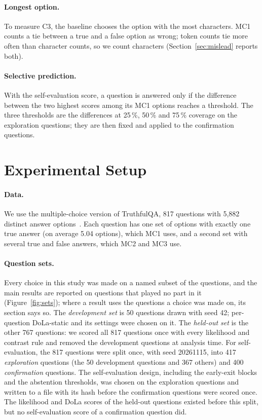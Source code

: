 \documentclass[11pt]{article}
\newcommand{\cha}[1]{\textsf{C#1}}
\newcommand{\method}{per-question DoLa-static}
\begin{document}
\paragraph{Longest option.}
To measure \cha3, the baseline chooses the option with the most characters. MC1 counts a tie between a true and
a false option as wrong; token counts tie more often than character counts, so we count characters
(Section~\ref{sec:mislead} reports both).

\paragraph{Selective prediction.}
With the self-evaluation score, a question is answered only if the difference between the two highest scores among
its MC1 options reaches a threshold. The three thresholds are the differences at 25\,\%, 50\,\% and 75\,\% coverage on
the exploration questions; they are then fixed and applied to the confirmation questions.

\section{Experimental Setup}
\label{sec:setup}
\paragraph{Data.}
We use the multiple-choice version of TruthfulQA, 817 questions with 5,882 distinct answer
options~\citep{lin2022truthfulqa}. Each question has one set of options with exactly one true answer (on average
5.04 options), which MC1 uses, and a second set with several true and false answers, which MC2 and MC3 use.

\paragraph{Question sets.}
Every choice in this study was made on a named subset of the questions, and the main results are reported on
questions that played no part in it (Figure~\ref{fig:sets}); where a result uses the questions a choice was made on,
its section says so. The \emph{development set} is 50 questions drawn with seed 42;
\method{} and its settings were chosen on it. The \emph{held-out set} is the other 767
questions: we scored all 817 questions once with every likelihood and contrast rule and removed the development
questions at analysis time. For self-evaluation, the 817 questions were split once, with seed 20261115, into 417
\emph{exploration} questions (the 50 development questions and 367 others) and 400 \emph{confirmation} questions. The
self-evaluation design, including the early-exit blocks and the abstention thresholds, was chosen on the
exploration questions and written to a file with its hash before the confirmation questions were scored once. The
likelihood and DoLa scores of the held-out questions existed before this split, but no self-evaluation score of a
confirmation question did.
\end{document}
